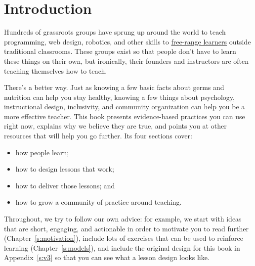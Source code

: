 \chapter{Introduction}\label{s:intro}

Hundreds of grassroots groups have sprung up around the world to teach
programming, web design, robotics, and other skills to \protect\hyperlink{g:free-range-learner}{free-range
learners} outside traditional classrooms. These
groups exist so that people don't have to learn these things on their
own, but ironically, their founders and instructors are often teaching
themselves how to teach.

There's a better way. Just as knowing a few basic facts about germs and
nutrition can help you stay healthy, knowing a few things about
psychology, instructional design, inclusivity, and community
organization can help you be a more effective teacher. This book
presents evidence-based practices you can use right now, explains why we
believe they are true, and points you at other resources that will help
you go further. Its four sections cover:

\begin{itemize}
\tightlist
\item
  how people learn;
\item
  how to design lessons that work;
\item
  how to deliver those lessons; and
\item
  how to grow a community of practice around teaching.
\end{itemize}

Throughout, we try to follow our own advice: for example, we start with
ideas that are short, engaging, and actionable in order to motivate you
to read further (Chapter~\ref{s:motivation}), include lots of exercises
that can be used to reinforce learning (Chapter~\ref{s:models}), and
include the original design for this book in Appendix~\ref{s:v3} so that
you can see what a lesson design looks like.

